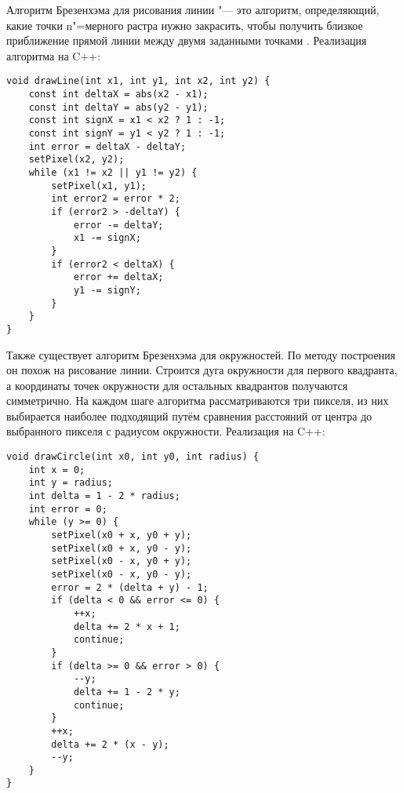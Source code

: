 Алгоритм Брезенхэма для рисования линии "--- это алгоритм, определяющий, какие точки n"=мерного растра нужно закрасить, чтобы получить близкое приближение прямой линии между двумя заданными точками . Реализация алгоритма на C++:
\begin{lstlisting}[style=myStyle]
void drawLine(int x1, int y1, int x2, int y2) {
    const int deltaX = abs(x2 - x1);
    const int deltaY = abs(y2 - y1);
    const int signX = x1 < x2 ? 1 : -1;
    const int signY = y1 < y2 ? 1 : -1;
    int error = deltaX - deltaY;
    setPixel(x2, y2);
    while (x1 != x2 || y1 != y2) {
        setPixel(x1, y1);
        int error2 = error * 2;
        if (error2 > -deltaY) {
            error -= deltaY;
            x1 -= signX;
        }
        if (error2 < deltaX) {
            error += deltaX;
            y1 -= signY;
        }
    }
}
\end{lstlisting}

Также существует алгоритм Брезенхэма для окружностей. По методу построения он похож на рисование линии. Строится дуга окружности для первого квадранта, а координаты точек окружности для остальных квадрантов получаются симметрично. На каждом шаге алгоритма рассматриваются три пикселя, из них выбирается наиболее подходящий путём сравнения расстояний от центра до выбранного пикселя с радиусом окружности. Реализация на C++: \cite{bresenham}
\begin{lstlisting}[style=myStyle]
void drawCircle(int x0, int y0, int radius) {
    int x = 0;
    int y = radius;
    int delta = 1 - 2 * radius;
    int error = 0;
    while (y >= 0) {
        setPixel(x0 + x, y0 + y);
        setPixel(x0 + x, y0 - y);
        setPixel(x0 - x, y0 + y);
        setPixel(x0 - x, y0 - y);
        error = 2 * (delta + y) - 1;
        if (delta < 0 && error <= 0) {
            ++x;
            delta += 2 * x + 1;
            continue;
        }
        if (delta >= 0 && error > 0) {
            --y;
            delta += 1 - 2 * y;
            continue;
        }
        ++x;
        delta += 2 * (x - y);
        --y;
    }
}
\end{lstlisting}